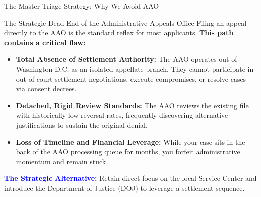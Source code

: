 \documentclass[11pt]{beamer}
\begin{document}
	\begin{frame}{The Master Triage Strategy: Why We Avoid AAO}
		\scriptsize
		\begin{block}{The Strategic Dead-End of the Administrative Appeals Office}
			Filing an appeal directly to the AAO is the standard reflex for most applicants. \textbf{This path contains a critical flaw:}
			\begin{itemize}
				\item \textbf{Total Absence of Settlement Authority:} The AAO operates out of Washington D.C. as an isolated appellate branch. They cannot participate in out-of-court settlement negotiations, execute compromises, or resolve cases via consent decrees.
				\item \textbf{Detached, Rigid Review Standards:} The AAO reviews the existing file with historically low reversal rates, frequently discovering alternative justifications to sustain the original denial.
				\item \textbf{Loss of Timeline and Financial Leverage:} While your case sits in the back of the AAO processing queue for months, you forfeit administrative momentum and remain stuck.
			\end{itemize}
			\textcolor{blue}{\textbf{The Strategic Alternative:}} Retain direct focus on the local Service Center and introduce the Department of Justice (DOJ) to leverage a settlement sequence.
		\end{block}
	\end{frame}
	
\end{document}
